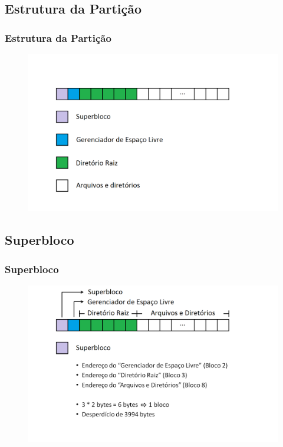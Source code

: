 \documentclass{beamer}
\begin{document}
\subsection{Estrutura da Partição}
\begin{frame}
\frametitle{Estrutura da Partição}
\begin{figure}
\centering
\includegraphics[scale=0.35]{particao2png.png}
\end{figure}
\justifying
\end{frame}


\subsection{Superbloco}
\begin{frame}
\frametitle{Superbloco}
\begin{figure}
\centering
\includegraphics[scale=0.35]{superblocopng.png}
\end{figure}
\justifying
\end{frame}
\end{document}
